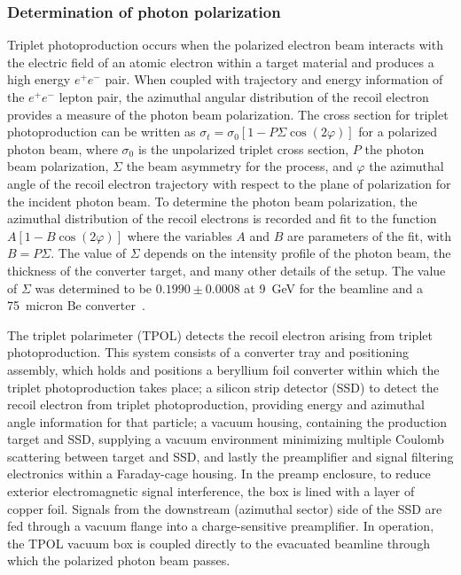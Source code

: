 \subsubsection{Determination of photon polarization \label{sec:polarization}}
Triplet photoproduction occurs when the polarized electron beam interacts
with the electric field of an atomic electron within a target material
and produces a high energy $e^+e^-$ pair. When coupled with
trajectory and energy information of the $e^+e^-$ lepton pair, the azimuthal
angular distribution of the recoil electron provides a measure of
the photon beam polarization. The cross section for triplet photoproduction
can be written as $\sigma_t = \sigma_0 [ 1 - P \Sigma \cos(2\varphi)]$
for a polarized photon beam, where $\sigma_0$ is the unpolarized triplet
cross section, $P$ the photon beam polarization, $\Sigma$ the beam
asymmetry for the process, and $\varphi$ the azimuthal angle of the
recoil electron trajectory with respect to the plane of polarization
for the incident photon beam. To determine the photon beam polarization,
the azimuthal distribution of the recoil electrons is recorded and fit
to the function $A [ 1- B \cos(2\varphi)]$  where the variables $A$ and
$B$ are parameters of the fit, with $B = P \Sigma$. The value of
$\Sigma$ depends on the intensity profile of the photon beam, the
thickness of the converter target, and many other details of the setup.
The value of $\Sigma$ was determined to be $0.1990 \pm 0.0008$ at 9~GeV for the \GX{} beamline
and a 75~micron Be converter~\cite{DUGGER2017115}.

The triplet polarimeter (TPOL) detects the recoil electron arising
from triplet photoproduction. This system consists of a converter tray and
positioning assembly, which holds and positions a beryllium foil converter
within which the triplet photoproduction takes place; a silicon strip detector
(SSD) to detect the recoil electron from triplet photoproduction, providing
energy and azimuthal angle information for that particle; a vacuum housing,
containing the production target and SSD, supplying a vacuum environment
minimizing multiple Coulomb scattering between target and SSD, and lastly
the preamplifier and signal filtering electronics within a Faraday-cage
housing. In the preamp enclosure, to reduce exterior electromagnetic
signal interference, the box is lined with a layer of copper foil.
Signals from the downstream (azimuthal sector) side of the SSD are
fed through a vacuum flange into a charge-sensitive preamplifier.
In operation, the TPOL vacuum box is coupled directly to the evacuated
beamline through which the polarized photon beam passes. 

